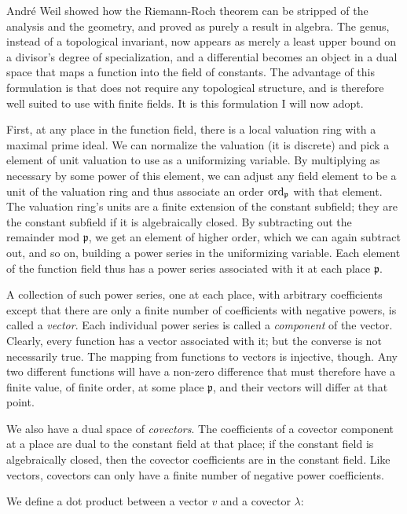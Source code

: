 Andr\'e Weil showed how the Riemann-Roch theorem can be stripped of
the analysis and the geometry, and proved as purely a result in
algebra.  The genus, instead of a topological invariant, now appears
as merely a least upper bound on a divisor's degree of specialization,
and a differential becomes an object in a dual space that maps a
function into the field of constants.  The advantage of this
formulation is that does not require any topological structure, and is
therefore well suited to use with finite fields.  It is this
formulation I will now adopt.

First, at any place in the function field, there is a local valuation
ring with a maximal prime ideal.  We can normalize the valuation (it
is discrete) and pick a element of unit valuation to use as a
uniformizing variable.  By multiplying as necessary by some power of
this element, we can adjust any field element to be a unit of the
valuation ring and thus associate an order ${\rm ord}_\mathfrak{p}$
with that element.  The valuation ring's units are a finite extension
of the constant subfield; they are the constant subfield if it is
algebraically closed.  By subtracting out the remainder mod
$\mathfrak{p}$, we get an element of higher order, which we can again
subtract out, and so on, building a power series in the uniformizing
variable.  Each element of the function field thus has a power series
associated with it at each place $\mathfrak{p}$.

A collection of such power series, one at each place, with arbitrary
coefficients except that there are only a finite number of
coefficients with negative powers, is called a {\it vector}.  Each
individual power series is called a {\it component} of the vector.
Clearly, every function has a vector associated with it; but the
converse is not necessarily true.  The mapping from functions to
vectors is injective, though.  Any two different functions will have a
non-zero difference that must therefore have a finite value, of finite
order, at some place $\mathfrak{p}$, and their vectors will differ at
that point.

We also have a dual space of {\it covectors}.  The coefficients of a
covector component at a place are dual to the constant field at that
place; if the constant field is algebraically closed, then the
covector coefficients are in the constant field.  Like vectors,
covectors can only have a finite number of negative power
coefficients.

We define a dot product between a vector $v$ and a covector $\lambda$:

